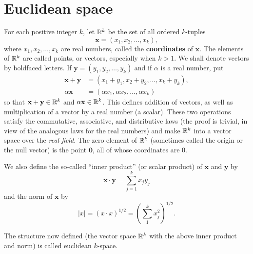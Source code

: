 \section{Euclidean space}

\begin{myDef}
    \label{myDef:1.36}
    For each positive integer $k$, 
    let ${\protect\mathbb R}^k$ be the set of all ordered $k$-tuples
    \begin{equation*}
        \mathbf{x} = \left(x_1,x_2,\dots,x_k\right),
    \end{equation*}
    where $x_1,x_2,\dots,x_k$ are real numbers, called the \textbf{coordinates} of $\mathbf{x}$. 
    The elements of ${\protect\mathbb R}^k$ are called points, or vectors, 
    especially when $k > 1$. We shall denote vectors
    by boldfaced letters. 
    If $\mathbf{y} = \left(y_1,y_2,\dots,y_k\right)$ 
    and if $\alpha$ is a real number, put
    \begin{align*}
        \mathbf{x} + \mathbf{y} &= \left(x_1+y_1,x_2+y_2,\dots,x_k+y_k\right),\\
        \alpha\mathbf{x}  &= \left(\alpha x_1,\alpha x_2,\dots,\alpha x_k\right)
    \end{align*}
    so that $\mathbf{x} +\mathbf{y} \in {\protect\mathbb R}^k$ and $\alpha\mathbf{x} \in {\protect\mathbb R}^k$. 
    This defines addition of vectors, 
    as well as multiplication of a vector by a real number (a scalar). 
    These two operations satisfy the commutative, associative, 
    and distributive laws 
    (the proof is trivial, in view of the analogous laws for the real numbers) 
    and make ${\protect\mathbb R}^k$ into a vector space over the \emph{real field}. 
    The zero element of ${\protect\mathbb R}^k$ (sometimes called the origin or the null vector) is the point $\mathbf{0}$, 
    all of whose coordinates are $0$.

    We also define the so-called ``inner product'' (or scalar product) of $\mathbf{x}$ and $\mathbf{y}$ by
    \begin{equation*}
        \mathbf{x}\cdot\mathbf{y} = \sum_{j=1}^{k}x_j y_j
    \end{equation*}
    and the norm of $\mathbf{x}$ by
    \begin{equation*}
        |x| = (x\cdot x)^{1/2} = \left( \sum_{1}^{k} x_j^2 \right)^{1/2}.
    \end{equation*}

    The structure now defined (the vector space ${\protect\mathbb R}^k$ with the above inner product and norm) is called euclidean $k$-space.
\end{myDef}

